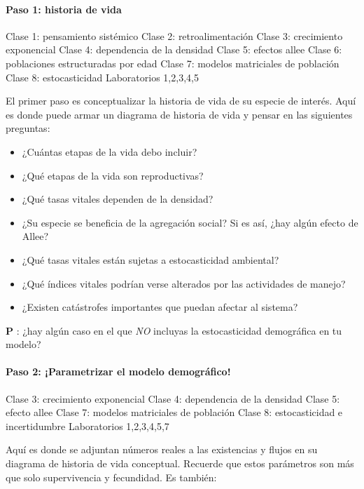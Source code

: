 \documentclass[
]{article}
\providecommand{\tightlist}{%
  \setlength{\itemsep}{0pt}\setlength{\parskip}{0pt}}
\begin{document}
\hypertarget{paso-1-historia-de-vida}{%
\paragraph{Paso 1: historia de vida}\label{paso-1-historia-de-vida}}

Clase 1: pensamiento sistémico Clase 2: retroalimentación Clase 3:
crecimiento exponencial Clase 4: dependencia de la densidad Clase 5:
efectos allee Clase 6: poblaciones estructuradas por edad Clase 7:
modelos matriciales de población Clase 8: estocasticidad Laboratorios
1,2,3,4,5

El primer paso es conceptualizar la historia de vida de su especie de
interés. Aquí es donde puede armar un diagrama de historia de vida y
pensar en las siguientes preguntas:

\begin{itemize}
\tightlist
\item
  ¿Cuántas etapas de la vida debo incluir?
\item
  ¿Qué etapas de la vida son reproductivas?
\item
  ¿Qué tasas vitales dependen de la densidad?
\item
  ¿Su especie se beneficia de la agregación social? Si es así, ¿hay
  algún efecto de Allee?
\item
  ¿Qué tasas vitales están sujetas a estocasticidad ambiental?
\item
  ¿Qué índices vitales podrían verse alterados por las actividades de
  manejo?
\item
  ¿Existen catástrofes importantes que puedan afectar al sistema?
\end{itemize}

\textbf{P }: ¿hay algún caso en el que \emph{NO } incluyas la
estocasticidad demográfica en tu modelo?

\hypertarget{paso-2-parametrizar-el-modelo-demogruxe1fico}{%
\paragraph{Paso 2: ¡Parametrizar el modelo
demográfico!}\label{paso-2-parametrizar-el-modelo-demogruxe1fico}}

Clase 3: crecimiento exponencial Clase 4: dependencia de la densidad
Clase 5: efecto allee Clase 7: modelos matriciales de población Clase 8:
estocasticidad e incertidumbre Laboratorios 1,2,3,4,5,7

Aquí es donde se adjuntan números reales a las existencias y flujos en
su diagrama de historia de vida conceptual. Recuerde que estos
parámetros son más que solo supervivencia y fecundidad. Es también:
\end{document}
